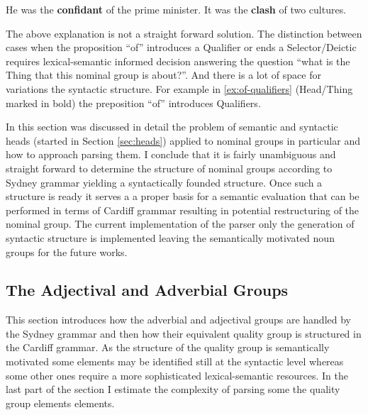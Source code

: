 \begin{exe}
    \ex \label{ex:of-qualifiers}He was the \textbf{confidant} of the prime minister.
    \ex It was the \textbf{clash} of two cultures.
\end{exe}

The above explanation is not a straight forward solution. The distinction between cases when the proposition ``of'' introduces a Qualifier or ends a Selector/Deictic requires lexical-semantic informed decision answering the question ``what is the Thing that this nominal group is about?''. And there is a lot of space for variations the syntactic structure. For example in \ref{ex:of-qualifiers} (Head/Thing marked in bold) the preposition ``of'' introduces Qualifiers.
 
In this section was discussed in detail the problem of semantic and syntactic heads (started in Section \ref{sec:heads}) applied to nominal groups in particular and how to approach parsing them. I conclude that it is fairly unambiguous and straight forward to determine the structure of nominal groups according to Sydney grammar yielding a syntactically founded structure. Once such a structure is ready it serves a a proper basis for a semantic evaluation that can be performed in terms of Cardiff grammar resulting in potential restructuring of the nominal group. The current implementation of the parser only the generation of syntactic structure is implemented leaving the semantically motivated noun groups for the future works. 

%
	
\subsection{The Adjectival and Adverbial Groups}
	\label{sec:advectival-adverbial-groups}

    This section introduces how the adverbial and adjectival groups are handled by the Sydney grammar and then how their equivalent quality group is structured in the Cardiff grammar. As the structure of the quality group is semantically motivated some elements may be identified still at the syntactic level whereas some other ones require a more sophisticated lexical-semantic resources. In the last part of the section I estimate the complexity of parsing some the quality group elements elements. 

